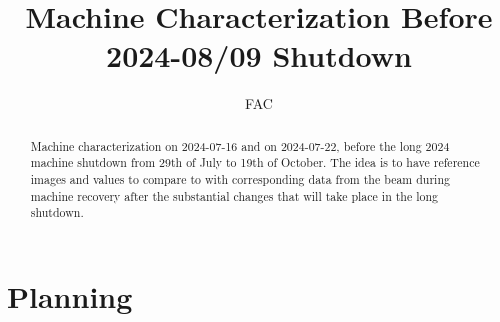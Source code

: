\documentclass{article}
\title{Machine Characterization Before 2024-08/09 Shutdown}
\author{FAC}
\begin{document}
\maketitle

\begin{abstract}
Machine characterization on 2024-07-16 and on 2024-07-22, before the long 2024 machine shutdown from 29th of July to 19th of October. The idea is to have reference images and values to compare to with corresponding data from the beam during machine recovery after the substantial changes that will take place in the long shutdown.
\end{abstract}

\section{Planning}
\end{document}
